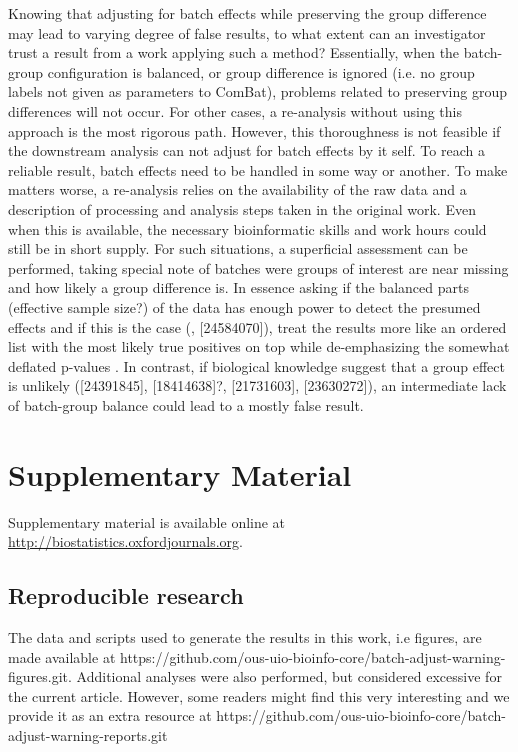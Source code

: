 \documentclass{bio}
\newcommand\CITE[1]{{\color{magenta}[#1]}}
\begin{document}
Knowing that adjusting for batch effects while preserving the group difference may lead to varying degree of false results, to what extent can an investigator trust a result from a work applying such a method? Essentially, when the batch-group configuration is balanced, or group difference is ignored  (i.e. no group labels not given as parameters to ComBat), problems related to preserving group differences will not occur. For other cases, a re-analysis without using this approach is the most rigorous path. However, this thoroughness is not feasible if the downstream  analysis can not adjust for batch effects by it self. To reach a reliable result, batch effects need to be handled in some way or another. To make matters worse, a re-analysis relies on the availability of the raw data and a description of processing and analysis steps taken in the original work. Even when this is available, the necessary bioinformatic skills and work hours could still be in short supply. For such situations, a superficial assessment can be performed, taking special note of batches were groups of interest are near missing and how likely a group difference is. In essence asking if the balanced parts (effective sample size?) of the data has enough power to detect the presumed effects and if this is the case (\citealp{Johnson2007}, \CITE{24584070}), treat the results more like an ordered list with the most likely true positives on top while de-emphasizing the somewhat deflated p-values . In contrast, if biological knowledge suggest that a group effect is unlikely  (\CITE{24391845}, \CITE{18414638}?, \CITE{21731603}, \CITE{23630272}), an intermediate lack of batch-group balance  could lead to a mostly false result.

\section{Supplementary Material}
\label{supp}

Supplementary material is available online at
\href{http://biostatistics.oxfordjournals.org}%
{http://biostatistics.oxfordjournals.org}.


\subsection{Reproducible research}

The data and scripts used to generate the results in this work, i.e figures, are made available at https://github.com/ous-uio-bioinfo-core/batch-adjust-warning-figures.git. Additional analyses were also performed, but considered excessive for the current  article. However, some readers might find this very interesting and we provide it as an extra resource at https://github.com/ous-uio-bioinfo-core/batch-adjust-warning-reports.git
\end{document}
